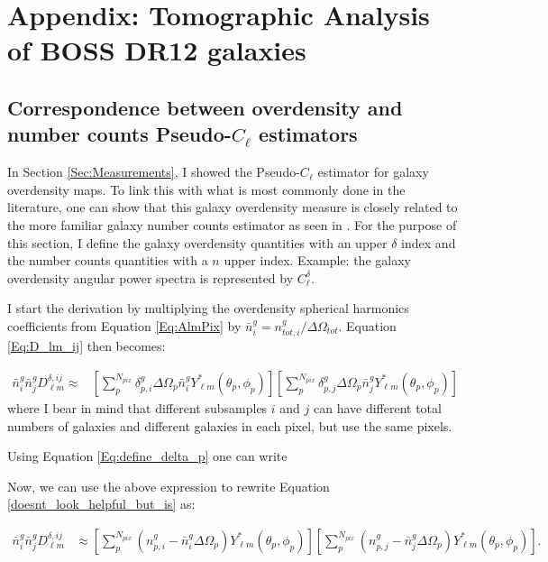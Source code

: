 \appendix
\chapter{Appendix: Tomographic Analysis of BOSS DR12 galaxies}
\section{Correspondence between overdensity and number counts Pseudo-$C_{\ell}$ estimators}\label{Apx:PCL}
In Section \ref{Sec:Measurements}, I showed the Pseudo-$C_{\ell}$ estimator for galaxy overdensity maps. To link this with what is most commonly done in the literature, one can show that this galaxy overdensity measure is closely related to the more familiar galaxy number counts estimator as seen in \cite{Peebles1973,ScharfLahav1992,FisherLahav1994,Blake2007,Thomas2011}. For the purpose of this section, I define the galaxy overdensity quantities with an upper $\delta$ index and the number counts quantities with a $n$ upper index. Example: the galaxy overdensity angular power spectra is represented by $C^{\delta}_{\ell}$.

\qquad I start the derivation by multiplying the overdensity spherical harmonics coefficients from Equation \eqref{Eq:AlmPix} by $\bar n^g_i  = n^g_{tot,i}/\Delta \Omega_{tot}$. Equation \eqref{Eq:D_lm_ij} then becomes:

\begin{align}
\label{doesnt_look_helpful_but_is}
{\bar n^g_i \bar n^g_j} D^{\delta, ij}_{\ell m} \approx & \left[ \sum_p^{N_{pix}} \delta_{p,i}^g \Delta\Omega_p \bar n^g_i Y_{\ell m}^{\ast}(\theta_p,\phi_p) \right]\left[ \sum_p^{N_{pix}} \delta_{p,j}^g \Delta\Omega_p \bar n^g_j Y_{\ell m}^{\ast}(\theta_p,\phi_p) \right]
\end{align}
where I bear in mind that different subsamples $ i $ and $j$ can have different total numbers of galaxies and different galaxies in each pixel, but use the same pixels. 

\qquad Using Equation \eqref{Eq:define_delta_p} one can write

\noindent Now, we can use the above expression to rewrite Equation \ref{doesnt_look_helpful_but_is} as:

\begin{align}
{\bar n^g_i \bar n^g_j} D^{\delta, ij}_{\ell m} & \approx  \left[ \sum_p^{N_{pix}} \left( n_{p,i}^g - \bar n^g_i \Delta\Omega_p \right) Y_{\ell m}^{\ast}(\theta_p,\phi_p) \right] \left[ \sum_p^{N_{pix}}  \left( n_{p,j}^g - \bar n^g_j \Delta\Omega_p \right) Y_{\ell m}^{\ast}(\theta_p,\phi_p) \right] .
\end{align}

